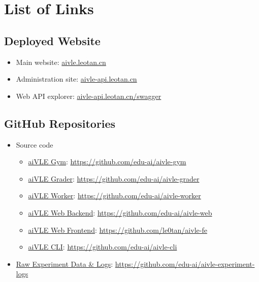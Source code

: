 \chapter{List of Links}
\label{appendix:links}

\section{Deployed Website}
\begin{itemize}
    \item Main website: \href{https://aivle.leotan.cn/}{aivle.leotan.cn}
    \item Administration site: \href{https://aivle-api.leotan.cn/api/v1/}{aivle-api.leotan.cn}
    \item Web API explorer: \href{https://aivle-api.leotan.cn/swagger/}{aivle-api.leotan.cn/swagger}
\end{itemize}

\section{GitHub Repositories}
\label{as:links-source_code}
\begin{itemize}
    \item Source code
    \begin{itemize}
        \item \href{https://github.com/edu-ai/aivle-gym}{aiVLE Gym}: \href{https://github.com/edu-ai/aivle-gym}{https://github.com/edu-ai/aivle-gym}
        \item \href{https://github.com/edu-ai/aivle-grader}{aiVLE Grader}: \href{https://github.com/edu-ai/aivle-grader}{https://github.com/edu-ai/aivle-grader}
        \item \href{https://github.com/edu-ai/aivle-worker}{aiVLE Worker}: \href{https://github.com/edu-ai/aivle-worker}{https://github.com/edu-ai/aivle-worker}
        \item \href{https://github.com/edu-ai/aivle-web}{aiVLE Web Backend}: \href{https://github.com/edu-ai/aivle-web}{https://github.com/edu-ai/aivle-web}
        \item \href{https://github.com/le0tan/aivle-fe}{aiVLE Web Frontend}: \href{https://github.com/le0tan/aivle-fe}{https://github.com/le0tan/aivle-fe}
        \item \href{https://github.com/edu-ai/aivle-cli}{aiVLE CLI}: \href{https://github.com/edu-ai/aivle-cli}{https://github.com/edu-ai/aivle-cli}
    \end{itemize}
    \item \href{https://github.com/edu-ai/aivle-experiment-logs}{Raw Experiment Data \& Logs}: \href{https://github.com/edu-ai/aivle-experiment-logs}{https://github.com/edu-ai/aivle-experiment-logs}
\end{itemize}


